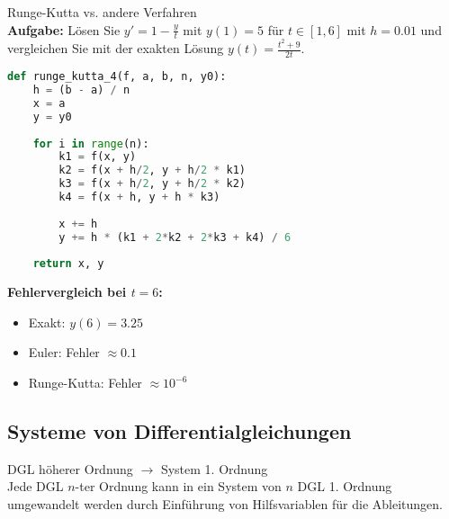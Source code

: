 \begin{example2}{Runge-Kutta vs. andere Verfahren}\\
\textbf{Aufgabe:} Lösen Sie $y' = 1 - \frac{y}{t}$ mit $y(1) = 5$ für $t \in [1,6]$ mit $h = 0.01$ und vergleichen Sie mit der exakten Lösung $y(t) = \frac{t^2 + 9}{2t}$.

\begin{lstlisting}[language=Python, style=basesmol]
def runge_kutta_4(f, a, b, n, y0):
    h = (b - a) / n
    x = a
    y = y0
    
    for i in range(n):
        k1 = f(x, y)
        k2 = f(x + h/2, y + h/2 * k1)
        k3 = f(x + h/2, y + h/2 * k2)
        k4 = f(x + h, y + h * k3)
        
        x += h
        y += h * (k1 + 2*k2 + 2*k3 + k4) / 6
        
    return x, y
\end{lstlisting}

\textbf{Fehlervergleich bei $t = 6$:}
\begin{itemize}
    \item Exakt: $y(6) = 3.25$
    \item Euler: Fehler $\approx 0.1$
    \item Runge-Kutta: Fehler $\approx 10^{-6}$
\end{itemize}
\end{example2}

\subsection{Systeme von Differentialgleichungen}

\begin{concept}{DGL höherer Ordnung $\rightarrow$ System 1. Ordnung}\\
Jede DGL $n$-ter Ordnung kann in ein System von $n$ DGL 1. Ordnung umgewandelt werden durch Einführung von Hilfsvariablen für die Ableitungen.
\end{concept}

